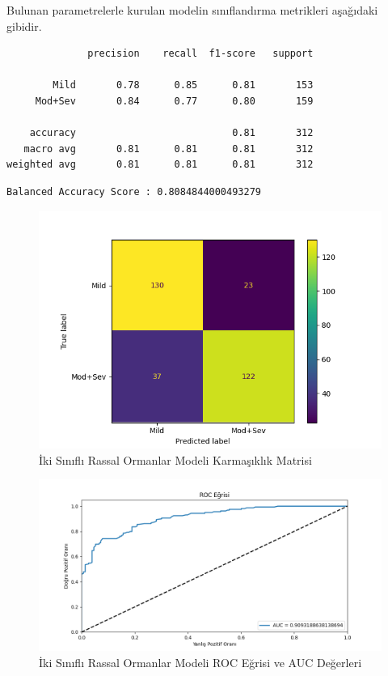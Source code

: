 \documentclass[12pt,twoside]{deuthesis}
\begin{document}
Bulunan parametrelerle kurulan modelin sınıflandırma metrikleri aşağıdaki gibidir.
\begin{verbatim}
              precision    recall  f1-score   support

        Mild       0.78      0.85      0.81       153
     Mod+Sev       0.84      0.77      0.80       159

    accuracy                           0.81       312
   macro avg       0.81      0.81      0.81       312
weighted avg       0.81      0.81      0.81       312
\end{verbatim}
\begin{verbatim}
Balanced Accuracy Score : 0.8084844000493279
\end{verbatim}
\begin{figure}

{\centering \includegraphics[width=1.05\linewidth,height=0.6\textheight]{figure/rf_bin_conf} 

}

\caption{İki Sınıflı Rassal Ormanlar Modeli Karmaşıklık Matrisi}\label{fig:unnamed-chunk-67}
\end{figure}
\begin{figure}

{\centering \includegraphics[width=1.05\linewidth,height=0.6\textheight]{figure/RandomForestClassifier_binary_roc} 

}

\caption{İki Sınıflı Rassal Ormanlar Modeli ROC Eğrisi ve AUC Değerleri}\label{fig:unnamed-chunk-68}
\end{figure}
\end{document}
